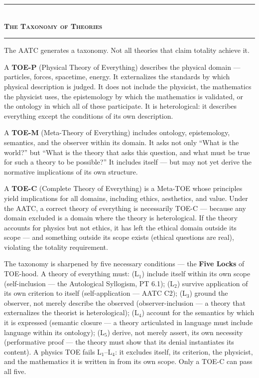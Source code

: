 \documentclass[10pt, openany, oneside]{book}
\renewcommand{\normalsize}{\fontsize{10}{13}\selectfont}
\begin{document}
\vspace{1.5em}


\begin{center}
    \rule{0.3\textwidth}{0.4pt}\\[0.5em]
    {\normalsize\bfseries\scshape The Taxonomy of Theories}\\[0.3em]
    \rule{0.3\textwidth}{0.4pt}
\end{center}

\vspace{1em}

\noindent The AATC generates a taxonomy. Not all theories that claim totality achieve it.

A \textbf{TOE-P} (Physical Theory of Everything) describes the physical domain --- particles, forces, spacetime, energy. It externalizes the standards by which physical description is judged. It does not include the physicist, the mathematics the physicist uses, the epistemology by which the mathematics is validated, or the ontology in which all of these participate. It is heterological: it describes everything except the conditions of its own description.

A \textbf{TOE-M} (Meta-Theory of Everything) includes ontology, epistemology, semantics, and the observer within its domain. It asks not only ``What is the world?'' but ``What is the theory that asks this question, and what must be true for such a theory to be possible?'' It includes itself --- but may not yet derive the normative implications of its own structure.

A \textbf{TOE-C} (Complete Theory of Everything) is a Meta-TOE whose principles yield implications for all domains, including ethics, aesthetics, and value. Under the AATC, a correct theory of everything is necessarily TOE-C --- because any domain excluded is a domain where the theory is heterological. If the theory accounts for physics but not ethics, it has left the ethical domain outside its scope --- and something outside its scope exists (ethical questions are real), violating the totality requirement.

The taxonomy is sharpened by five necessary conditions --- the \textbf{Five Locks} of TOE-hood. A theory of everything must: (L$_1$) include itself within its own scope (self-inclusion --- the Autological Syllogism, PT 6.1); (L$_2$) survive application of its own criterion to itself (self-application --- AATC C2); (L$_3$) ground the observer, not merely describe the observed (observer-inclusion --- a theory that externalizes the theorist is heterological); (L$_4$) account for the semantics by which it is expressed (semantic closure --- a theory articulated in language must include language within its ontology); (L$_5$) derive, not merely assert, its own necessity (performative proof --- the theory must show that its denial instantiates its content). A physics TOE fails L$_1$--L$_4$: it excludes itself, its criterion, the physicist, and the mathematics it is written in from its own scope. Only a TOE-C can pass all five.
\end{document}
